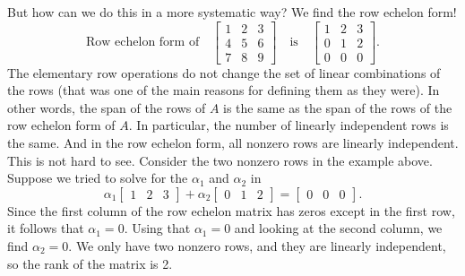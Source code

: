 But how can we do this in a more systematic way?  We find the row echelon
form!
\begin{equation*}
\text{Row echelon form of}
\quad
\begin{bmatrix}
1 & 2 & 3 \\
4 & 5 & 6  \\
7 & 8 & 9
\end{bmatrix}
\quad
\text{is}
\quad
\begin{bmatrix}
1 & 2 & 3 \\
0 & 1 & 2  \\
0 & 0 & 0
\end{bmatrix} .
\end{equation*}
The elementary row operations do not change the set of linear combinations of
the rows (that was one of the main reasons for defining them as they were).
In other words, the span of the rows of $A$ is the same
as the span of the rows of the row echelon form of $A$.
In particular, the number of linearly independent rows is the same.
And in the row echelon form, all nonzero rows are linearly independent.
This is not hard to see.
Consider the two nonzero rows in the example above.
Suppose we
tried to solve for the $\alpha_1$ and $\alpha_2$
in
\begin{equation*}
\alpha_1
\begin{bmatrix}
1 & 2 & 3
\end{bmatrix}
+
\alpha_2
\begin{bmatrix}
0 & 1 & 2
\end{bmatrix} =
\begin{bmatrix}
0 & 0 & 0
\end{bmatrix} .
\end{equation*}
Since the first column
of the row echelon matrix has zeros except in the first row, it follows that
$\alpha_1 = 0$.  Using that $\alpha_1=0$ and looking at the second
column, we find $\alpha_2=0$.
We only have two nonzero rows,
and they are linearly independent, so the rank of the matrix is 2.

